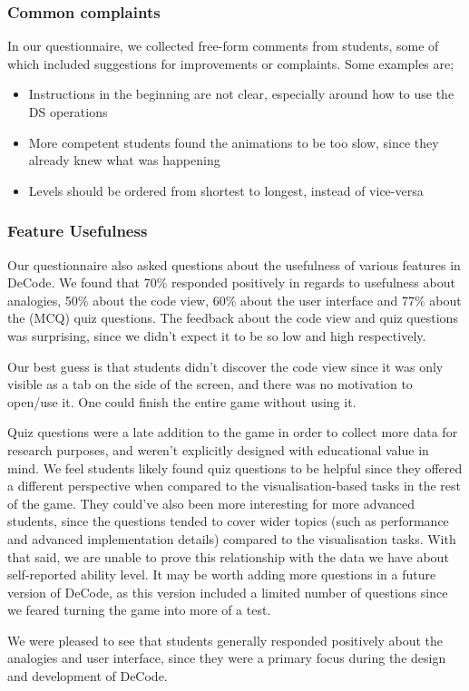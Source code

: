 \documentclass[11pt]{article}
\begin{document}
\subsubsection{Common complaints}
In our questionnaire, we collected free-form comments from students, some of which included suggestions for improvements or complaints. Some examples are;
\begin{spacing}{1.5}
\begin{itemize}
  \item Instructions in the beginning are not clear, especially around how to use the DS operations
  \item More competent students found the animations to be too slow, since they already knew what was happening
  \item Levels should be ordered from shortest to longest, instead of vice-versa
\end{itemize}
\end{spacing}
\subsubsection{Feature Usefulness}
Our questionnaire also asked questions about the usefulness of various features in DeCode. We found that 70\% responded positively in regards to usefulness about analogies, 50\% about the code view, 60\% about the user interface and 77\% about the (MCQ) quiz questions. The feedback about the code view and quiz questions was surprising, since we didn't expect it to be so low and high respectively.\par
Our best guess is that students didn't discover the code view since it was only visible as a tab on the side of the screen, and there was no motivation to open/use it. One could finish the entire game without using it.\par
Quiz questions were a late addition to the game in order to collect more data for research purposes, and weren't explicitly designed with educational value in mind. We feel students likely found quiz questions to be helpful since they offered a different perspective when compared to the visualisation-based tasks in the rest of the game. They could've also been more interesting for more advanced students, since the questions tended to cover wider topics (such as performance and advanced implementation details) compared to the visualisation tasks. With that said, we are unable to prove this relationship with the data we have about self-reported ability level. It may be worth adding more questions in a future version of DeCode, as this version included a limited number of questions since we feared turning the game into more of a test.\par
We were pleased to see that students generally responded positively about the analogies and user interface, since they were a primary focus during the design and development of DeCode.
\end{document}

